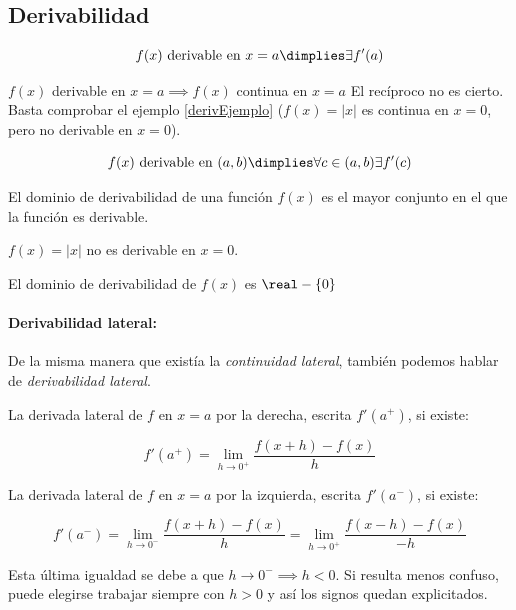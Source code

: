 \subsection{Derivabilidad}
\begin{defn}
\[f(x) \text{ derivable en } x=a\dimplies \exists f'(a)\]
\end{defn}

\begin{prop}
$f(x)$ derivable en $x=a \implies f(x)$ continua en $x=a$
\obs El recíproco no es cierto. Basta comprobar el ejemplo \ref{derivEjemplo} ($f(x) = |x|$ es continua en $x=0$, pero no derivable en $x=0$).
\end{prop}

\begin{defn}
\[f(x) \text{ derivable en } (a,b) \dimplies \forall c\in(a,b) \exists f'(c) \]
\end{defn}

\begin{defn}
El dominio de derivabilidad de una función $f(x)$ es el mayor conjunto en el que la función es derivable.
\end{defn}

\begin{example}
$f(x) = |x|$ no es derivable en $x=0$.

El dominio de derivabilidad de $f(x)$ es $\real-\{0\}$
\end{example}


\paragraph{Derivabilidad lateral:} De la misma manera que existía la \textit{continuidad lateral}, también podemos hablar de \textit{derivabilidad lateral}. 

\begin{defn}
La derivada lateral de $f$ en $x=a$ por la derecha, escrita $f'(a^+)$, si existe:

\[f'(a^+) = \lim_{h\to 0^+} \frac{f(x+h)-f(x)}{h}\]

La derivada lateral de $f$ en $x=a$ por la izquierda, escrita $f'(a^-)$, si existe:

\[f'(a^-) = \lim_{h\to 0^-} \frac{f(x+h)-f(x)}{h} =  \lim_{h\to 0^+} \frac{f(x-h)-f(x)}{-h}\]

\obs Esta última igualdad se debe a que $h\to 0^-\implies h<0$. Si resulta menos confuso, puede elegirse trabajar siempre con $h>0$ y así los signos quedan explicitados.
\end{defn}

